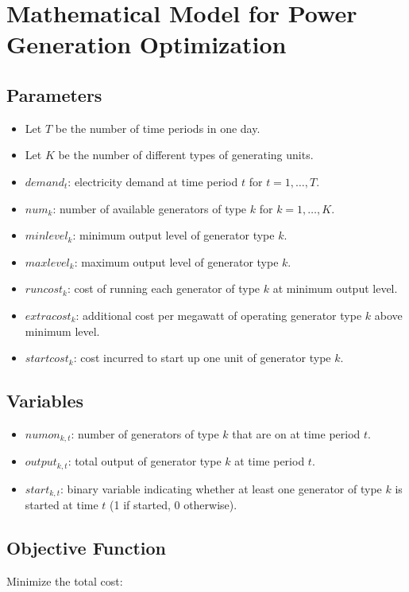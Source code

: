 \documentclass{article}
\begin{document}
\section*{Mathematical Model for Power Generation Optimization}

\subsection*{Parameters}
\begin{itemize}
    \item Let \( T \) be the number of time periods in one day.
    \item Let \( K \) be the number of different types of generating units.
    \item \( demand_t \): electricity demand at time period \( t \) for \( t = 1, \ldots, T \).
    \item \( num_k \): number of available generators of type \( k \) for \( k = 1, \ldots, K \).
    \item \( minlevel_k \): minimum output level of generator type \( k \).
    \item \( maxlevel_k \): maximum output level of generator type \( k \).
    \item \( runcost_k \): cost of running each generator of type \( k \) at minimum output level.
    \item \( extracost_k \): additional cost per megawatt of operating generator type \( k \) above minimum level.
    \item \( startcost_k \): cost incurred to start up one unit of generator type \( k \).
\end{itemize}

\subsection*{Variables}
\begin{itemize}
    \item \( numon_{k,t} \): number of generators of type \( k \) that are on at time period \( t \).
    \item \( output_{k,t} \): total output of generator type \( k \) at time period \( t \).
    \item \( start_{k,t} \): binary variable indicating whether at least one generator of type \( k \) is started at time \( t \) (1 if started, 0 otherwise).
\end{itemize}

\subsection*{Objective Function}
Minimize the total cost:
\end{document}
